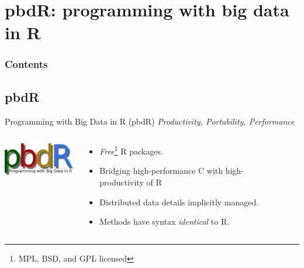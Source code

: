 \section[pbdR]{pbdR: programming with big data in R}

\hidenum
\begin{frame}[noframenumbering]
\frametitle{Contents}
\end{frame}
\shownum

\subsection{pbdR}

\begin{frame}
  \begin{block}{Programming with Big Data in R (pbdR)}
       \centering \emph{Productivity, Portability, Performance}\\[.4cm]
  \begin{columns}[onlytextwidth]
    \begin{column}{0.30\textwidth}
      \centering
       \includegraphics[width=3.4cm]{../common/pics/simple}\\[.2cm]
    \end{column}
    \begin{column}{0.65\textwidth}
  \begin{itemize}
    \item \emph{Free}\footnote{MPL, BSD, and GPL licensed} R packages.
    \item Bridging high-performance C with high-productivity of R
    \item Distributed data details implicitly managed.
    \item Methods have syntax \emph{identical} to R.
  \end{itemize}
    \end{column}
​  \end{columns}
\end{block}
\end{frame}

